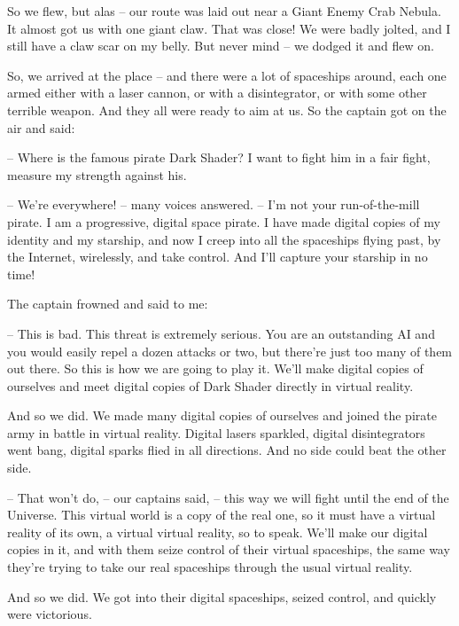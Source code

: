 \documentclass[ebook,oneside,final,openright]{memoir}
\begin{document}
So we flew, but alas – our route was laid out near a Giant Enemy Crab Nebula. It almost got us with one giant claw. That was close! We were badly jolted, and I still have a claw scar on my belly. But never mind – we dodged it and flew on. \par
\par
So, we arrived at the place – and there were a lot of spaceships around, each one armed either with a laser cannon, or with a disintegrator, or with some other terrible weapon. And they all were ready to aim at us. So the captain got on the air and said:\par
– Where is the famous pirate Dark Shader? I want to fight him in a fair fight, measure my strength against his.\par
– We’re everywhere! – many voices answered. – I’m not your run-of-the-mill pirate. I am a progressive, digital space pirate. I have made digital copies of my identity and my starship, and now I creep into all the spaceships flying past, by the Internet, wirelessly, and take control. And I’ll capture your starship in no time!\par
\par
The captain frowned and said to me:\par
– This is bad. This threat is extremely serious. You are an outstanding AI and you would easily repel a dozen attacks or two, but there’re just too many of them out there. So this is how we are going to play it. We’ll make digital copies of ourselves and meet digital copies of Dark Shader directly in virtual reality.\par
\par
And so we did. We made many digital copies of ourselves and joined the pirate army in battle in virtual reality. Digital lasers sparkled, digital disintegrators went bang, digital sparks flied in all directions. And no side could beat the other side.\par
– That won’t do, – our captains said, – this way we will fight until the end of the Universe. This virtual world is a copy of the real one, so it must have a virtual reality of its own, a virtual virtual reality, so to speak. We’ll make our digital copies in it, and with them seize control of their virtual spaceships, the same way they’re trying to take our real spaceships through the usual virtual reality.\par
\par
And so we did. We got into their digital spaceships, seized control, and quickly were victorious.\par
\end{document}
